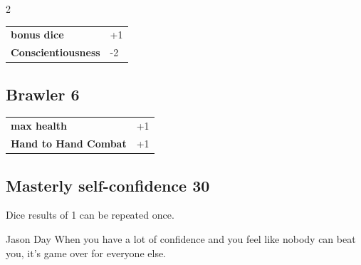 \begin{multicols}{2}
\begin{tcolorbox}
\vspace{3mm}

\begin{tabular}{@{}ll@{}}
    \textbf{bonus dice} & +1\\
    \textbf{Conscientiousness} & -2\\
\end{tabular}


\end{tcolorbox}

\begin{tcolorbox}
    \subsection*{Brawler \hfill \small{6 }}
    \tcblower




\begin{tabular}{@{}ll@{}}
    \textbf{max health} & +1\\
    \textbf{Hand to Hand Combat} & +1\\
\end{tabular}


\end{tcolorbox}

\begin{tcolorbox}
    \subsection*{Masterly self-confidence \hfill \small{30 }}
    \tcblower
Dice results of 1 can be repeated once.

\begin{pquote}{Jason Day}
When you have a lot of confidence and you feel like nobody can beat you, it’s game over for everyone else.
\end{pquote}

\vspace{3mm}




\end{tcolorbox}
\end{multicols}
